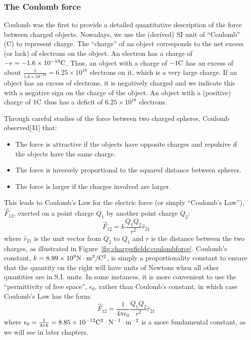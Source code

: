 \subsubsection{The Coulomb force}

Coulomb was the first to provide a detailed quantitative description of the force between charged objects. Nowadays, we use the (derived) SI unit of ``Coulomb'' (C) to represent charge. The ``charge'' of an object corresponds to the net excess (or lack) of electrons on the object. An electron has a charge of $-e= -1.6\times 10^{ -19} {\rm C}$. Thus, an object with a charge of $-1 {\rm C}$ has an excess of about $\frac{1}{1.6\times 10^{ -19}}=6.25\times 10^{18}$ electrons on it, which is a very large charge. If an object has an excess of electrons, it is negatively charged and we indicate this with a negative sign on the charge of the object. An object with a (positive) charge of $1 {\rm C}$ thus has a deficit of $6.25\times 10^{18}$ electrons.

Through careful studies of the force between two charged spheres, Coulomb observed[\^41] that:

\begin{itemize}
\item The force is attractive if the objects have opposite charges and repulsive if the objects have the same charge.
\item The force is inversely proportional to the squared distance between spheres.
\item The force is larger if the charges involved are larger.
\end{itemize}

This leads to Coulomb's Law for the electric force (or simply ``Coulomb's Law''), $\vec F_{12}$, exerted on a point charge $Q_1$ by another point charge $Q_2$:
\begin{equation}
\boxed{\vec F_{12}=k\frac{Q_1Q_2}{r^2}\hat r_{21}}
\end{equation}
where $\hat r_{21}$ is the unit vector from $Q_2$ to $Q_1$ and $r$ is the distance between the two charges, as illustrated in Figure~\ref{fig:chargesfields:coulombforce}. Coulomb's constant, $k=8.99\times 10^9 {\rm N\cdot m^2/C^{2}}$, is simply a proportionality constant to ensure that the quantity on the right will have units of Newtons when all other quantities are in S.I. units. In some instances, it is more convenient to use the ``permittivity of free space'', $\epsilon_0$, rather than Coulomb's constant, in which case Coulomb's Law has the form:
\begin{equation}
\vec F_{12}=\frac{1}{4\pi\epsilon_0}\frac{Q_1Q_2}{r^2}\hat r_{21}
\end{equation}
where $\epsilon_0=\frac{1}{4\pi k}=8.85\times 10^{ -12} {\rm C^2\cdot N^{ -1}\cdot m^{ -2}}$ is a more fundamental constant, as we will see in later chapters.

